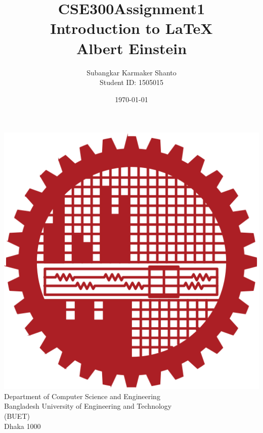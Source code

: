 \documentclass{book}
\title {CSE300\textunderscore Assignment1 \\Introduction to \LaTeX \\Albert Einstein}
\author{Subangkar Karmaker Shanto\\Student ID: 1505015}
\date{}
\begin{document}
\begin{titlepage}
\maketitle
\begin{center}
\includegraphics[width=.2\textwidth]{figures/logoBIRN.png}
Department of Computer Science and Engineering \\
Bangladesh University of Engineering and Technology\\
(BUET)\\
Dhaka 1000 \\
\date{\today}
\end{center}
\end{titlepage}
 
\newpage
\end{document}
